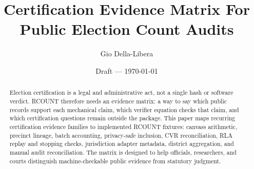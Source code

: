 \documentclass[12pt]{article}
\title{Certification Evidence Matrix For Public Election Count Audits}
\author{Gio Della-Libera}
\date{Draft --- \today}
\begin{document}
\maketitle

\begin{abstract}
Election certification is a legal and administrative act, not a single hash or
software verdict. RCOUNT therefore needs an evidence matrix: a way to say which
public records support each mechanical claim, which verifier equation checks
that claim, and which certification questions remain outside the package. This
paper maps recurring certification evidence families to implemented RCOUNT
fixtures: canvass arithmetic, precinct lineage, batch accounting, privacy-safe
inclusion, CVR reconciliation, RLA replay and stopping checks, jurisdiction
adapter metadata, district aggregation, and manual audit reconciliation. The
matrix is designed to help officials, researchers, and courts distinguish
machine-checkable public evidence from statutory judgment.
\end{abstract}








\nocite{eac-canvass-certification,eac-voting-system-certification,ncsl-post-election-audits,colorado-rla-faq,colorado-rule-25,california-rla-regulations,rcount-substrate-2026}


\end{document}
